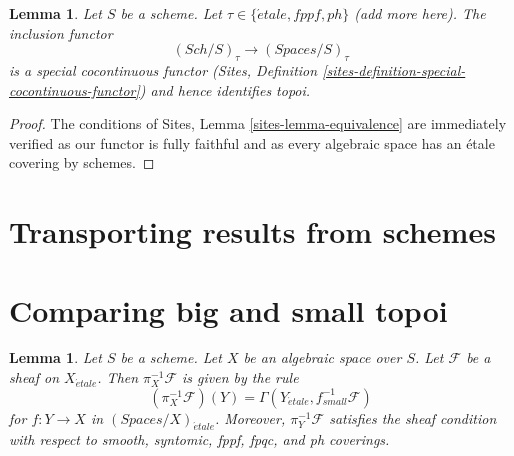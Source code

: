 \documentclass{stacks-project}
\theoremstyle{plain}
\newtheorem{lemma}[subsection]{Lemma}
\theoremstyle{definition}
\theoremstyle{remark}
\numberwithin{equation}{subsection}
\def\Sch{\mathit{Sch}}
\def\etale{{\acute{e}tale}}
\begin{document}
\begin{lemma}
\label{lemma-compare-cohomology-other-topologies}
Let $S$ be a scheme. Let $\tau \in \{\etale, fppf, ph\}$ (add more here).
The inclusion functor
$$
(\Sch/S)_\tau \longrightarrow (\textit{Spaces}/S)_\tau
$$
is a special cocontinuous functor
(Sites, Definition \ref{sites-definition-special-cocontinuous-functor})
and hence identifies topoi.
\end{lemma}

\begin{proof}
The conditions of Sites, Lemma \ref{sites-lemma-equivalence}
are immediately verified as our functor is fully faithful
and as every algebraic space has an \'etale covering by schemes.
\end{proof}

\section{Transporting results from schemes}
\label{section-api}

\section{Comparing big and small topoi}
\label{section-compare}

\begin{lemma}
\label{lemma-describe-pullback}
Let $S$ be a scheme. Let $X$ be an algebraic space over $S$.
Let $\mathcal{F}$ be a sheaf on $X_\etale$. Then
$\pi_X^{-1}\mathcal{F}$ is given by the rule
$$
(\pi_X^{-1}\mathcal{F})(Y) = \Gamma(Y_\etale, f_{small}^{-1}\mathcal{F})
$$
for $f : Y \to X$ in $(\textit{Spaces}/X)_\etale$.
Moreover, $\pi_Y^{-1}\mathcal{F}$ satisfies the
sheaf condition with respect to smooth, syntomic, fppf, fpqc, and ph coverings.
\end{lemma}
\end{document}
